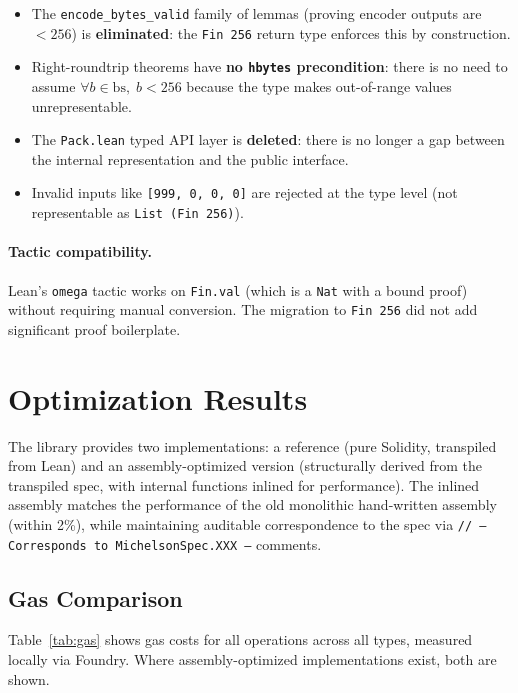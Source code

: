 \documentclass[11pt,a4paper]{article}
\begin{document}
\begin{itemize}
  \item The \texttt{encode\_bytes\_valid} family of lemmas (proving encoder outputs
    are $< 256$) is \textbf{eliminated}: the \texttt{Fin 256} return type enforces
    this by construction.
  \item Right-roundtrip theorems have \textbf{no \texttt{hbytes} precondition}:
    there is no need to assume $\forall b \in \text{bs},\; b < 256$ because the
    type makes out-of-range values unrepresentable.
  \item The \texttt{Pack.lean} typed API layer is \textbf{deleted}: there is no
    longer a gap between the internal representation and the public interface.
  \item Invalid inputs like \texttt{[999, 0, 0, 0]} are rejected at the type level
    (not representable as \texttt{List (Fin 256)}).
\end{itemize}

\paragraph{Tactic compatibility.} Lean's \texttt{omega} tactic works on
\texttt{Fin.val} (which is a \texttt{Nat} with a bound proof) without requiring
manual conversion.  The migration to \texttt{Fin 256} did not add significant
proof boilerplate.

\section{Optimization Results}

The library provides two implementations: a reference (pure Solidity,
transpiled from Lean) and an assembly-optimized version (structurally derived
from the transpiled spec, with internal functions inlined for performance).
The inlined assembly matches the performance of the old monolithic hand-written
assembly (within 2\%), while maintaining auditable correspondence to the spec
via \texttt{// -- Corresponds to MichelsonSpec.XXX --} comments.

\subsection{Gas Comparison}

Table~\ref{tab:gas} shows gas costs for all operations across all types,
measured locally via Foundry. Where assembly-optimized implementations exist,
both are shown.
\end{document}
